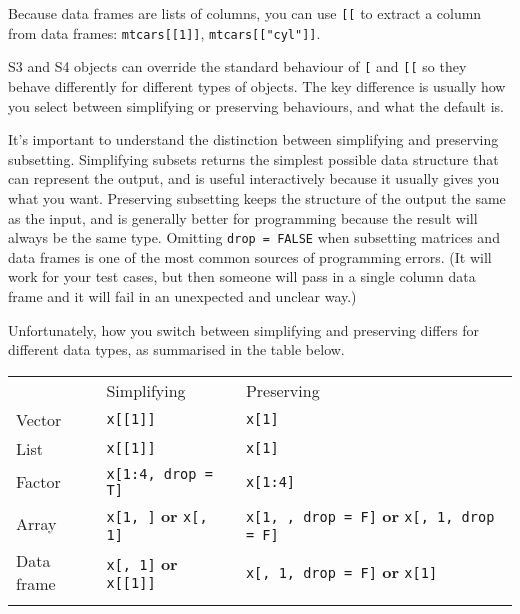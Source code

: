 Because data frames are lists of columns, you can use \texttt{{[}{[}} to
extract a column from data frames: \texttt{mtcars{[}{[}1{]}{]}},
\texttt{mtcars{[}{[}"cyl"{]}{]}}. 

S3 and S4 objects can override the standard behaviour of \texttt{{[}}
and \texttt{{[}{[}} so they behave differently for different types of
objects. The key difference is usually how you select between
simplifying or preserving behaviours, and what the default is.


It's important to understand the distinction between simplifying and
preserving subsetting. Simplifying subsets returns the simplest possible
data structure that can represent the output, and is useful
interactively because it usually gives you what you want. Preserving
subsetting keeps the structure of the output the same as the input, and
is generally better for programming because the result will always be
the same type. Omitting \texttt{drop = FALSE} when subsetting matrices
and data frames is one of the most common sources of programming errors.
(It will work for your test cases, but then someone will pass in a
single column data frame and it will fail in an unexpected and unclear
way.)  

Unfortunately, how you switch between simplifying and preserving differs
for different data types, as summarised in the table below.

\begin{longtable}[c]{@{}lll@{}}
\toprule\addlinespace
& Simplifying & Preserving
\\\addlinespace
\midrule\endhead
Vector & \texttt{x{[}{[}1{]}{]}} & \texttt{x{[}1{]}}
\\\addlinespace
List & \texttt{x{[}{[}1{]}{]}} & \texttt{x{[}1{]}}
\\\addlinespace
Factor & \texttt{x{[}1:4, drop = T{]}} & \texttt{x{[}1:4{]}}
\\\addlinespace
Array & \texttt{x{[}1, {]}} \textbf{or} \texttt{x{[}, 1{]}} &
\texttt{x{[}1, , drop = F{]}} \textbf{or} \texttt{x{[}, 1, drop = F{]}}
\\\addlinespace
Data frame & \texttt{x{[}, 1{]}} \textbf{or} \texttt{x{[}{[}1{]}{]}} &
\texttt{x{[}, 1, drop = F{]}} \textbf{or} \texttt{x{[}1{]}}
\\\addlinespace
\bottomrule
\end{longtable}

